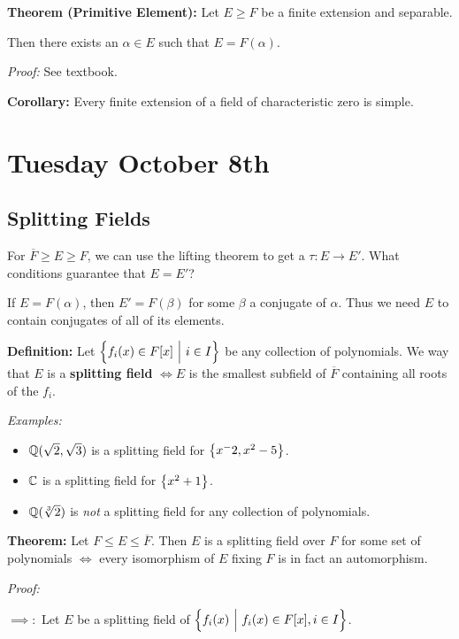 \textbf{Theorem (Primitive Element):} Let \(E\geq F\) be a finite
extension and separable.

Then there exists an \(\alpha \in E\) such that \(E = F(\alpha)\).

\emph{Proof:} See textbook.

\textbf{Corollary:} Every finite extension of a field of characteristic
zero is simple.

\hypertarget{tuesday-october-8th}{%
\section{Tuesday October 8th}\label{tuesday-october-8th}}

\hypertarget{splitting-fields}{%
\subsection{Splitting Fields}\label{splitting-fields}}

For \(\overline F \geq E \geq F\), we can use the lifting theorem to get
a \(\tau: E \to E'\). What conditions guarantee that \(E = E'\)?

If \(E = F(\alpha)\), then \(E' = F(\beta)\) for some \(\beta\) a
conjugate of \(\alpha\). Thus we need \(E\) to contain conjugates of all
of its elements.

\textbf{Definition:} Let \(\left\{{f_i(x) \in F[x] {~\mathrel{\Big|}~} i\in I}\right\}\)
be any collection of polynomials. We way that \(E\) is a
\textbf{splitting field} \(\iff E\) is the smallest subfield of
\(\overline F\) containing all roots of the \(f_i\).

\emph{Examples:}

\begin{itemize}
\item
  \({\mathbb{Q}}(\sqrt 2, \sqrt 3)\) is a splitting field for
  \(\left\{{x^-2, x^2 - 5}\right\}\).
\item
  \({\mathbb{C}}\) is a splitting field for \(\left\{{x^2 + 1}\right\}\).
\item
  \({\mathbb{Q}}(\sqrt[3] 2)\) is \emph{not} a splitting field for any collection
  of polynomials.
\end{itemize}

\textbf{Theorem:} Let \(F \leq E \leq \overline F\). Then \(E\) is a
splitting field over \(F\) for some set of polynomials \(\iff\) every
isomorphism of \(E\) fixing \(F\) is in fact an automorphism.

\emph{Proof:}

\(\implies:\) Let \(E\) be a splitting field of
\(\left\{{f_i(x) {~\mathrel{\Big|}~} f_i(x) \in F[x], i\in I}\right\}\).

